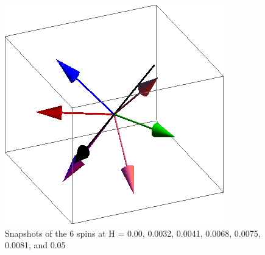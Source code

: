 \documentclass{article}
\begin{document}
\begin{figure}[ht]
\includegraphics[scale=0.27]{501S000to005R.png}
\caption{Snapshots of the 6 spins at H = 0.00, 0.0032, 0.0041, 0.0068, 0.0075, 0.0081, and 0.05}
\end{figure}
\end{document}
